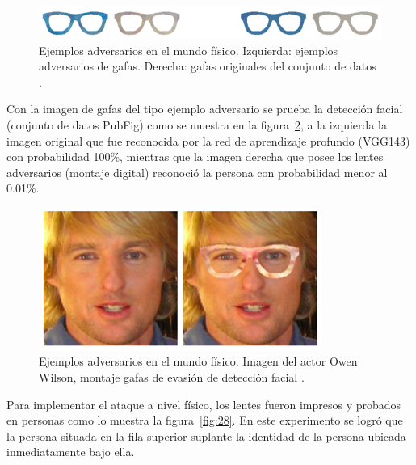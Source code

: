 \begin{figure}[th]
\centering
\includegraphics [scale = 0.9] {Figures/figura_26.PNG}
\decoRule
\caption[Ejemplos adversarios de gafas]{Ejemplos adversarios en el mundo físico. Izquierda: ejemplos adversarios de gafas. Derecha: gafas originales del conjunto de datos \parencite{r56}.}
\label{fig:26}
\end{figure}

Con la imagen de gafas del tipo ejemplo adversario se prueba la detección facial (conjunto de datos PubFig) como se muestra en la figura~\ref{fig:27}, a la izquierda la imagen original que fue reconocida por la red de aprendizaje profundo (VGG143) con probabilidad 100\%, mientras que la imagen derecha que posee los lentes adversarios (montaje digital) reconoció la persona con probabilidad menor al 0.01\%. 

\begin{figure}[th]
\centering
\includegraphics [scale = 1] {Figures/figura_27.PNG}
\decoRule
\caption[Imagen del actor Owen Wilson, montaje gafas de evasión de detección facial]{Ejemplos adversarios en el mundo físico. Imagen del actor Owen Wilson, montaje gafas de evasión de detección facial \parencite{r56}.}
\label{fig:27}
\end{figure}

Para implementar el ataque a nivel físico, los lentes fueron impresos y probados en personas como lo muestra la figura~\ref{fig:28}. En este experimento se logró que la persona situada en la fila superior suplante la identidad de la persona ubicada inmediatamente bajo ella.

